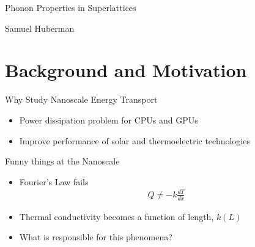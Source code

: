 \documentclass{beamer}
\begin{document}
\begin{frame}
\Large{Phonon Properties in Superlattices}

\small{Samuel Huberman}\\

\date{
	\\
	\vspace{1cm}
	\today
}
\end{frame}

\section{Background and Motivation}
\begin{frame}{Why Study Nanoscale Energy Transport}
\begin{itemize}
\item Power dissipation problem for CPUs and GPUs
\item Improve performance of solar and thermoelectric technologies
\end{itemize}
\end{frame}

\begin{frame}{Funny things at the Nanoscale}
\begin{itemize}
\item Fourier's Law fails
\begin{equation}\label{EQ:NMD:qdot}
\begin{split}
Q\neq-k\frac{dT}{dx}
\end{split}
\end{equation}

\item Thermal conductivity becomes a function of length, $k(L)$

\item What is responsible for this phenomena?
\end{itemize}
\end{frame}
\end{document}

